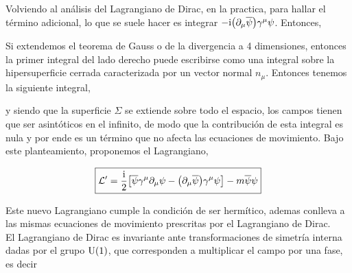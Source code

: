 Volviendo al análisis del Lagrangiano de Dirac, en la practica, para hallar el término adicional, lo que se suele hacer es integrar $-\mathrm{i} \qty(\partial_\mu  \overline{\psi})  \gamma^\mu \psi  $. Entonces,

Si extendemos el teorema de Gauss o de la divergencia a 4 dimensiones, entonces la primer integral del lado derecho puede escribirse como una integral sobre la hipersuperficie cerrada caracterizada por un vector normal $n_\mu$. Entonces tenemos la siguiente integral, 

y siendo que la superficie $\Sigma$ se extiende sobre todo el espacio, los campos tienen que ser asintóticos en el infinito, de modo que la contribución de esta integral es nula y por ende es un término que no afecta las ecuaciones de movimiento. Bajo este planteamiento, proponemos el Lagrangiano,

\begin{equation}
	\boxed{ \mathcal{L}^\prime  = \frac{\mathrm{i}}{2} \qty[\overline{\psi} \gamma^\mu \partial_\mu \psi -  \qty( \partial_\mu \overline{\psi} ) \gamma^\mu \psi ]- m\overline{\psi} \psi}
\end{equation}

Este nuevo Lagrangiano cumple la condición de ser hermítico, ademas conlleva a las mismas ecuaciones de movimiento prescritas por el Lagrangiano  de Dirac. \\

El Lagrangiano de Dirac es invariante ante transformaciones de simetría interna dadas por el grupo  $\mathrm{U}(1)$, que corresponden a multiplicar el campo por una fase, es decir

